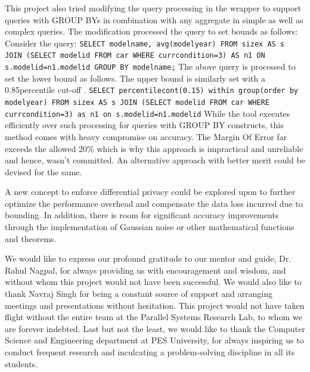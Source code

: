 \documentclass[acmsmall]{acmart}
\begin{document}
This project also tried modifying the query processing in the wrapper to support queries with GROUP BYs in combination with any aggregate in simple as well as complex queries. The modification processed the query to set bounds as follows:
\newline
\newline
Consider the query:
\newline
\newline
\texttt{SELECT model\textunderscore name, avg(model\textunderscore year) FROM size\textunderscore x AS s JOIN (SELECT model\textunderscore id FROM car WHERE curr\textunderscore condition=3) AS n1 ON s.model\textunderscore id=n1.model\textunderscore id GROUP BY model\textunderscore name;}
\newline
\newline
The above query is processed to set the lower bound as follows. The upper bound is similarly set with a 0.85percentile cut-off .
\newline
\newline
\texttt{SELECT percentile\textunderscore cont(0.15) within group(order by model\textunderscore year) FROM size\textunderscore x AS s JOIN (SELECT model\textunderscore id FROM car WHERE curr\textunderscore condition=3) as n1 on s.model\textunderscore id=n1.model\textunderscore id}
\newline
\newline
While the tool executes efficiently over such processing for queries with GROUP BY constructs, this method comes with heavy compromise on accuracy. The Margin Of Error far exceeds the allowed 20\% which is why this approach is impractical and unreliable and hence, wasn’t committed. An alternative approach with better merit could be devised for the same.

A new concept to enforce differential privacy could be explored upon to further optimize the performance overhead and compensate the data loss incurred due to bounding. In addition, there is room for significant accuracy improvements through the implementation of Gaussian noise or other mathematical functions and theorems.

\begin{acks}
We would like to express our profound gratitude to our mentor and guide, Dr. Rahul Nagpal, for always providing us with encouragement and wisdom, and without whom this project would not have been successful. We would also like to thank Navraj Singh for being a constant source of support and arranging meetings and presentations without hesitation. This project would not have taken flight without the entire team at the Parallel Systems Research Lab, to whom we are forever indebted. Last but not the least, we would like to thank the Computer Science and Engineering department at PES University, for always inspiring us to conduct frequent research and inculcating a problem-solving discipline in all its students.
\end{acks}
\end{document}
